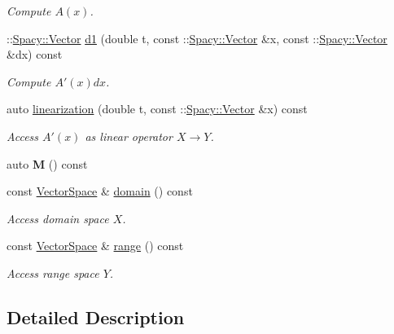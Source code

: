 \begin{DoxyCompactItemize}
\begin{DoxyCompactList}\small\item\em Compute $A(x)$. \end{DoxyCompactList}\item 
\+::\hyperlink{classSpacy_1_1Vector}{Spacy\+::\+Vector} \hyperlink{classSpacy_1_1FEniCS_1_1DynamicC1Operator_a8bd863650b985126b346df28fbc51099_a8bd863650b985126b346df28fbc51099}{d1} (double t, const \+::\hyperlink{classSpacy_1_1Vector}{Spacy\+::\+Vector} \&x, const \+::\hyperlink{classSpacy_1_1Vector}{Spacy\+::\+Vector} \&dx) const 
\begin{DoxyCompactList}\small\item\em Compute $A'(x)dx$. \end{DoxyCompactList}\item 
auto \hyperlink{classSpacy_1_1FEniCS_1_1DynamicC1Operator_a784d79ad68d02992ebfbbeaf59323177_a784d79ad68d02992ebfbbeaf59323177}{linearization} (double t, const \+::\hyperlink{classSpacy_1_1Vector}{Spacy\+::\+Vector} \&x) const 
\begin{DoxyCompactList}\small\item\em Access $A'(x)$ as linear operator $X\rightarrow Y$. \end{DoxyCompactList}\item 
\hypertarget{classSpacy_1_1FEniCS_1_1DynamicC1Operator_aa6acb8dcdd1a68b8649b6de5a760d58c}{}auto {\bfseries M} () const \label{classSpacy_1_1FEniCS_1_1DynamicC1Operator_aa6acb8dcdd1a68b8649b6de5a760d58c}

\item 
const \hyperlink{classSpacy_1_1VectorSpace}{Vector\+Space} \& \hyperlink{classSpacy_1_1OperatorBase_a2588f9b3e0188820c4c494e63293dc6f_a2588f9b3e0188820c4c494e63293dc6f}{domain} () const 
\begin{DoxyCompactList}\small\item\em Access domain space $X$. \end{DoxyCompactList}\item 
const \hyperlink{classSpacy_1_1VectorSpace}{Vector\+Space} \& \hyperlink{classSpacy_1_1OperatorBase_ab19d3b7a6f290b1079248f1e567e53d6_ab19d3b7a6f290b1079248f1e567e53d6}{range} () const 
\begin{DoxyCompactList}\small\item\em Access range space $Y$. \end{DoxyCompactList}\end{DoxyCompactItemize}


\subsection{Detailed Description}
